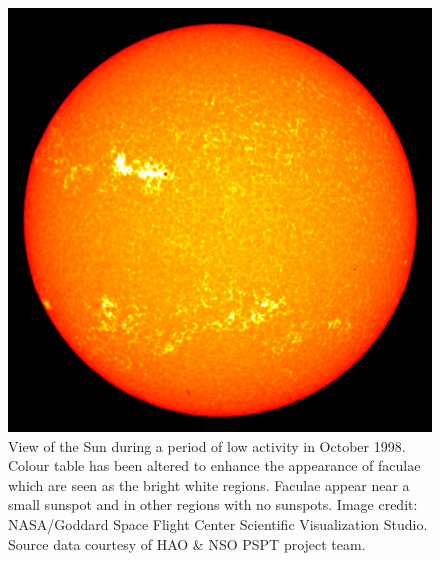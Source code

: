 \begin{figure}
    \centering
    \includegraphics[scale=0.15]{Figures/1-Introduction/faculae_example.jpg}
    \caption[Example of faculae during a period of low activity on the Sun]{View of the Sun during a period of low activity in October 1998. Colour table has been altered to enhance the appearance of faculae which are seen as the bright white regions. Faculae appear near a small sunspot and in other regions with no sunspots. Image credit: NASA/Goddard Space Flight Center Scientific Visualization Studio. Source data courtesy of HAO \& NSO PSPT project team.}
    \label{fig:faculae_example}
\end{figure}

